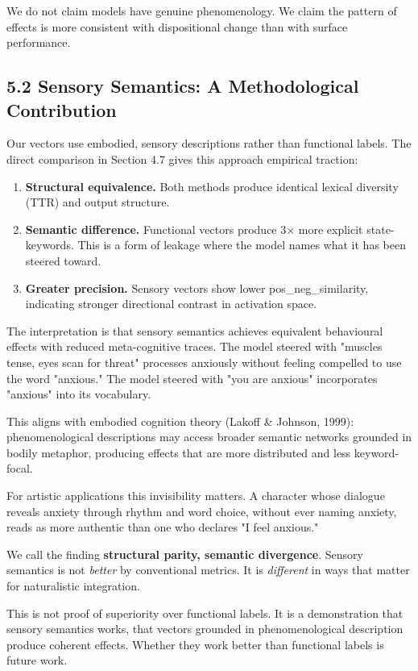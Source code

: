 \documentclass[11pt,a4paper]{article}
\begin{document}
We do not claim models have genuine phenomenology. We claim the pattern of effects is more consistent with dispositional change than with surface performance.

\subsection*{5.2 Sensory Semantics: A Methodological Contribution}

Our vectors use embodied, sensory descriptions rather than functional labels. The direct comparison in Section 4.7 gives this approach empirical traction:

\begin{enumerate}[leftmargin=*]
  \item \textbf{Structural equivalence.} Both methods produce identical lexical diversity (TTR) and output structure.
  \item \textbf{Semantic difference.} Functional vectors produce 3\ensuremath{\times} more explicit state-keywords. This is a form of leakage where the model names what it has been steered toward.
  \item \textbf{Greater precision.} Sensory vectors show lower pos\_neg\_similarity, indicating stronger directional contrast in activation space.
\end{enumerate}

The interpretation is that sensory semantics achieves equivalent behavioural effects with reduced meta-cognitive traces. The model steered with "muscles tense, eyes scan for threat" processes anxiously without feeling compelled to use the word "anxious." The model steered with "you are anxious" incorporates "anxious" into its vocabulary.

This aligns with embodied cognition theory (Lakoff \& Johnson, 1999): phenomenological descriptions may access broader semantic networks grounded in bodily metaphor, producing effects that are more distributed and less keyword-focal.

For artistic applications this invisibility matters. A character whose dialogue reveals anxiety through rhythm and word choice, without ever naming anxiety, reads as more authentic than one who declares "I feel anxious."

We call the finding \textbf{structural parity, semantic divergence}. Sensory semantics is not \emph{better} by conventional metrics. It is \emph{different} in ways that matter for naturalistic integration.

This is not proof of superiority over functional labels. It is a demonstration that sensory semantics works, that vectors grounded in phenomenological description produce coherent effects. Whether they work better than functional labels is future work.
\end{document}
